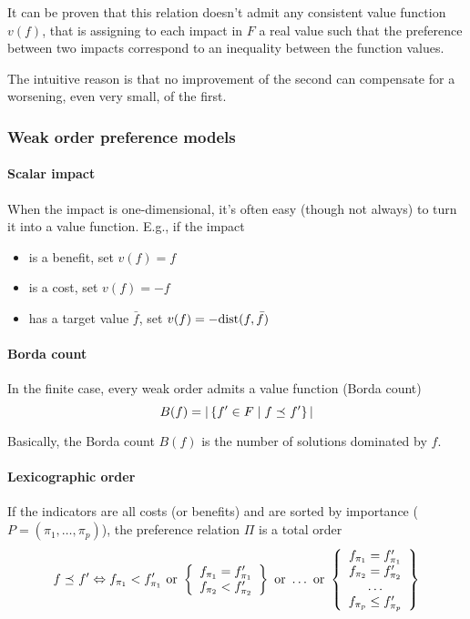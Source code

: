 It can be proven that this relation doesn't admit any consistent value function $v(f)$, that is assigning to each impact in $F$ a real value such that the preference between two impacts correspond to an inequality between the function values.

The intuitive reason is that no improvement of the second can compensate for a worsening, even very small, of the first.


\subsubsection{Weak order preference models}

\paragraph{Scalar impact} When the impact is one-dimensional, it's often easy (though not always) to turn it into a value function. E.g., if the impact
\begin{itemize}
	\item is a benefit, set $v(f) = f$
	
	\item is a cost, set $v(f) = -f$
	
	\item has a target value $\bar f$, set $v(f) = - \text{dist}(f, \bar f)$
\end{itemize}

\paragraph{Borda count} In the finite case, every weak order admits a value function (Borda count)
$$ B(f) = |\left\{f' \in F \mid f \preceq_{} f' \right\}|$$

Basically, the Borda count $B(f)$ is the number of solutions dominated by $f$.

\paragraph{Lexicographic order} If the indicators are all costs (or benefits) and are sorted by importance ($P = (\pi_1, \dots, \pi_p)$), the preference relation $\Pi$ is a total order
$$ f \preceq_{} f' \Leftrightarrow f_{\pi_1} < f_{\pi_1}' \text{ or } \left\{
\begin{array}{c}
	f_{\pi_1} = f_{\pi_1}' \\
	f_{\pi_2} < f_{\pi_2}' 
\end{array}\right\} \text{ or } \dots \text{ or } \left\{\begin{array}{c}
f_{\pi_1} = f_{\pi_1}' \\
f_{\pi_2} = f_{\pi_2}'  \\
\dots  \\
f_{\pi_p} \leq f_{\pi_p}'
\end{array}\right\}
$$

